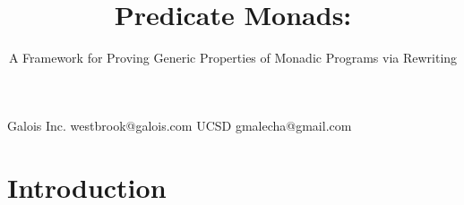 \documentclass[preprint]{sigplanconf}
\begin{document}




\setlength{\pdfpageheight}{\paperheight}
\setlength{\pdfpagewidth}{\paperwidth}






\title{Predicate Monads:}
\subtitle{A Framework for Proving Generic Properties of Monadic Programs via Rewriting}

           {Galois Inc.}
           {westbrook@galois.com}
           {UCSD}
           {gmalecha@gmail.com}

\maketitle








\section{Introduction}

\end{document}
